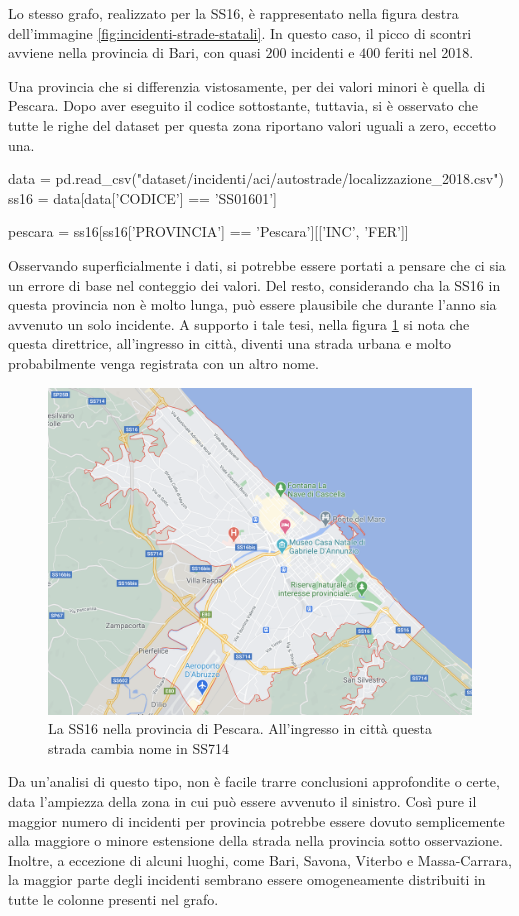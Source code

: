 \documentclass[a4paper,12pt]{report}
\begin{document}
Lo stesso grafo, realizzato per la SS16, è rappresentato nella figura destra dell'immagine 
\ref{fig:incidenti-strade-statali}. 
In questo caso, il picco di scontri avviene nella provincia 
di Bari, con quasi $200$ incidenti e $400$ feriti nel 2018. 

Una provincia che si differenzia vistosamente, per dei valori minori è quella di Pescara. 
Dopo aver eseguito il codice sottostante, tuttavia, si è osservato che tutte le righe 
del dataset per questa zona riportano valori uguali a zero, eccetto una. 

\begin{code}
data = pd.read_csv("dataset/incidenti/aci/autostrade/localizzazione_2018.csv")
ss16 = data[data['CODICE'] == 'SS01601']

pescara = ss16[ss16['PROVINCIA'] == 'Pescara'][['INC', 'FER']]
\end{code}

Osservando superficialmente i dati, si potrebbe essere portati a pensare 
che ci sia un errore di base nel conteggio dei valori. 
Del resto, considerando cha la SS16 in questa provincia non è molto lunga, 
può essere plausibile che durante l'anno sia avvenuto un solo incidente. 
A supporto i tale tesi, nella figura \ref{fig:ss16-pescara} si nota che questa direttrice, 
all'ingresso in città, diventi una strada urbana e molto probabilmente venga 
registrata con un altro nome.

\begin{figure}
    \hfill\includegraphics[width=0.7\linewidth]{img/pescara_ss16.png}\hspace*{\fill}
    \caption{La SS16 nella provincia di Pescara. All'ingresso in città questa strada cambia nome in SS714}
    \label{fig:ss16-pescara}
\end{figure}

Da un'analisi di questo tipo, non è facile trarre conclusioni approfondite 
o certe, data l'ampiezza della zona in cui può essere avvenuto il sinistro. 
Così pure il maggior numero di incidenti per provincia potrebbe essere dovuto 
semplicemente alla maggiore o minore estensione della strada nella 
provincia sotto osservazione. 
Inoltre, a eccezione di alcuni luoghi, come Bari, Savona, Viterbo e Massa-Carrara, 
la maggior parte degli incidenti sembrano essere omogeneamente distribuiti 
in tutte le colonne presenti nel grafo. 
\end{document}
